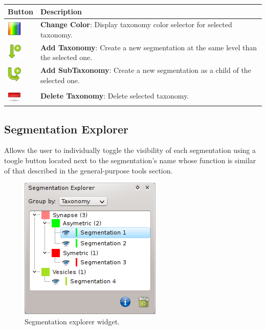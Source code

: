\begin{tabular}{| m{1.3cm} | m{12cm} |}
\hline
\textbf{Button} & \textbf{Description}\\
\hline
\includegraphics[width=0.7cm]{../../frontend/rsc/rainbow} &
\textbf{Change Color}: Display taxonomy color selector for selected taxonomy.\\
\hline
\includegraphics[width=0.7cm]{../../frontend/rsc/create_node} &
\textbf{Add Taxonomy}: Create a new segmentation at the same level than the
selected one.\\
\hline
\includegraphics[width=0.7cm]{../../frontend/rsc/create_subnode} &
\textbf{Add SubTaxonomy}: Create a new segmentation as a child of the selected
one.\\
\hline
\includegraphics[width=0.7cm]{../../frontend/rsc/remove} &
\textbf{Delete Taxonomy}: Delete selected taxonomy.\\
\hline
\end{tabular}
\vspace{0.3cm}

\subsection{Segmentation Explorer}
Allows the user to individually toggle the visibility of each segmentation using a toogle button
located next to the segmentation's name whose function is similar of that described in the
general-purpose tools section.
\begin{figure}[H]
\centering
\includegraphics{fig/SegmentationExplorer}
\caption{Segmentation explorer widget.}
\end{figure}

